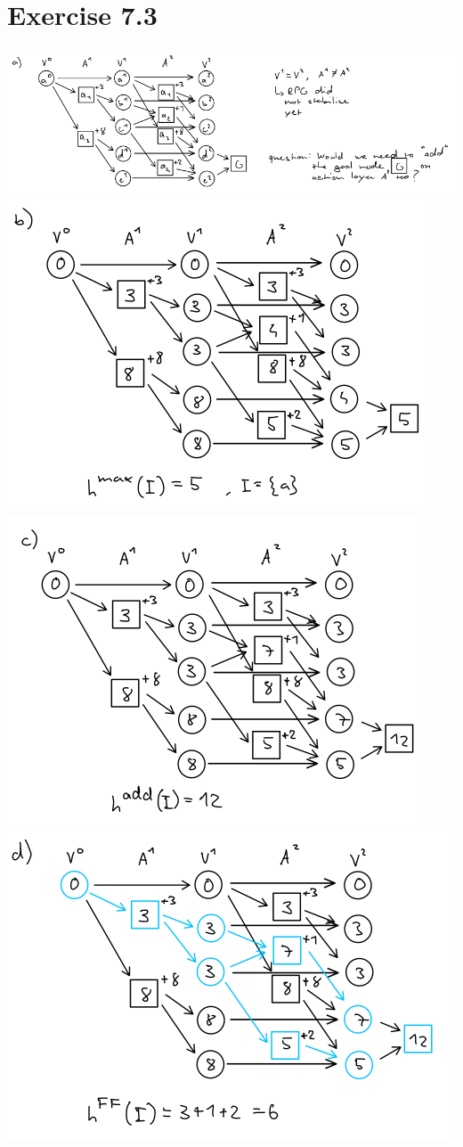 \documentclass[12pt]{article}
\begin{document}
\section*{Exercise 7.3}

\includegraphics[width=\textwidth]{figures/7.3a.png}\\
\includegraphics[width=.6\textwidth]{figures/7.3b.png}\\
\includegraphics[width=.6\textwidth]{figures/7.3c.png}\\
\includegraphics[width=.6\textwidth]{figures/7.3d.png}\\
\end{document}
